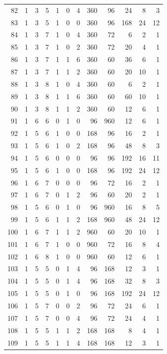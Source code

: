 \documentclass[11pt,a4paper]{article}
\begin{document}
\begin{longtable}{r|rrr|rrr|rrr|rr}
82 & 1 & 3 & 5 & 1 & 0 & 4 & 360 & 96 & 24 & 8 & 3\\
83 & 1 & 3 & 5 & 1 & 0 & 0 & 360 & 96 & 168 & 24 & 12\\
84 & 1 & 3 & 7 & 1 & 0 & 4 & 360 & 72 & 6 & 2 & 1\\
85 & 1 & 3 & 7 & 1 & 0 & 2 & 360 & 72 & 20 & 4 & 1\\
86 & 1 & 3 & 7 & 1 & 1 & 6 & 360 & 60 & 36 & 6 & 1\\
87 & 1 & 3 & 7 & 1 & 1 & 2 & 360 & 60 & 20 & 10 & 1\\
88 & 1 & 3 & 8 & 1 & 0 & 4 & 360 & 60 & 6 & 2 & 1\\
89 & 1 & 3 & 8 & 1 & 1 & 6 & 360 & 60 & 60 & 10 & 1\\
90 & 1 & 3 & 8 & 1 & 1 & 2 & 360 & 60 & 12 & 6 & 1\\
91 & 1 & 6 & 6 & 0 & 1 & 0 & 96 & 960 & 12 & 6 & 1\\
92 & 1 & 5 & 6 & 1 & 0 & 0 & 168 & 96 & 16 & 2 & 1\\
93 & 1 & 5 & 6 & 1 & 0 & 2 & 168 & 96 & 48 & 8 & 3\\
94 & 1 & 5 & 6 & 0 & 0 & 0 & 96 & 96 & 192 & 16 & 11\\
95 & 1 & 5 & 6 & 1 & 0 & 0 & 168 & 96 & 192 & 24 & 12\\
96 & 1 & 6 & 7 & 0 & 0 & 0 & 96 & 72 & 16 & 2 & 1\\
97 & 1 & 6 & 7 & 0 & 1 & 2 & 96 & 60 & 20 & 2 & 1\\
98 & 1 & 5 & 6 & 0 & 1 & 0 & 96 & 960 & 16 & 8 & 5\\
99 & 1 & 5 & 6 & 1 & 1 & 2 & 168 & 960 & 48 & 24 & 12\\
100 & 1 & 6 & 7 & 1 & 1 & 2 & 960 & 60 & 20 & 10 & 1\\
101 & 1 & 6 & 7 & 1 & 0 & 0 & 960 & 72 & 16 & 8 & 4\\
102 & 1 & 6 & 8 & 1 & 0 & 0 & 960 & 60 & 12 & 6 & 1\\
103 & 1 & 5 & 5 & 0 & 1 & 4 & 96 & 168 & 12 & 3 & 1\\
104 & 1 & 5 & 5 & 0 & 1 & 4 & 96 & 168 & 32 & 8 & 3\\
105 & 1 & 5 & 5 & 0 & 1 & 0 & 96 & 168 & 192 & 24 & 12\\
106 & 1 & 5 & 7 & 0 & 0 & 2 & 96 & 72 & 24 & 6 & 1\\
107 & 1 & 5 & 7 & 0 & 0 & 4 & 96 & 72 & 24 & 4 & 1\\
108 & 1 & 5 & 5 & 1 & 1 & 2 & 168 & 168 & 8 & 4 & 1\\
109 & 1 & 5 & 5 & 1 & 1 & 4 & 168 & 168 & 12 & 3 & 1\\

\end{longtable}
\end{document}
